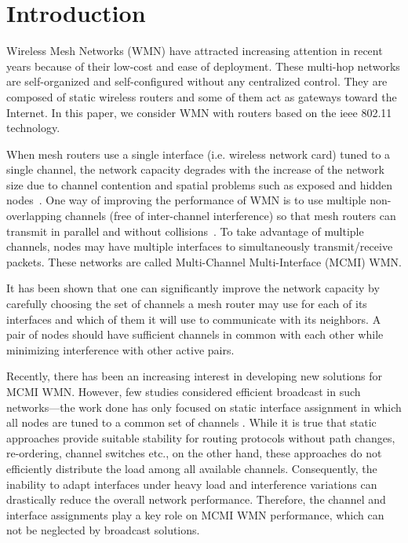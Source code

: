 \documentclass[twoside]{article}
\newcommand{\ieee}{{\sc ieee} 802.11\xspace}
\begin{document}
\section{Introduction}\label{sec:Introduction}

Wireless Mesh Networks (WMN) have attracted increasing attention in recent years
because of their
low-cost and ease of deployment.  
These multi-hop networks are self-organized and self-configured without any centralized control.
They are composed of static wireless routers and some of them act as gateways toward the Internet. 
In this paper, we consider WMN with routers based on the \ieee technology.
 

When mesh routers use a single interface (i.e. wireless network card) tuned to a single channel,
the network capacity degrades with the increase of the network size due to channel contention
and spatial problems such as exposed and hidden nodes~\cite{chaudet05}.
One way of improving the performance of WMN is to use multiple non-overlapping channels (free of inter-channel interference) so that mesh routers can transmit in parallel and without collisions~\cite{li09}.  
To take advantage of multiple channels, nodes may have multiple interfaces to simultaneously transmit/receive packets. 
These networks are called Multi-Channel Multi-Interface (MCMI) WMN.


It has been shown that one can significantly improve the network capacity by carefully choosing
the set of channels a mesh router may use for each of its interfaces and which of them it will use to communicate with its neighbors.
A pair of nodes should have sufficient channels in common with each other while minimizing interference with other active pairs. 


Recently, there has been an increasing interest in developing new solutions
for MCMI WMN. 
However, few studies considered efficient broadcast in such networks---the work done has only focused on static interface assignment in which all nodes are tuned to 
a common set of channels \cite{qadir07,yang09}. 
While it is true that static approaches provide suitable stability
for routing protocols without path changes, re-ordering,
channel switches etc., on the other hand, these approaches
do not efficiently distribute the load among all available
channels. Consequently, the inability to adapt interfaces under heavy load
and interference variations can drastically reduce the overall
network performance.
Therefore, the channel and interface assignments play a key role on MCMI WMN performance, 
which can not be neglected by broadcast solutions. 
\end{document}
